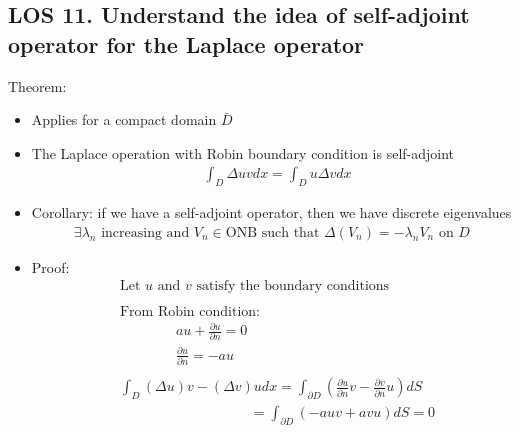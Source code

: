 \documentclass[12pt, a4paper]{article}
\begin{document}
\subsection*{LOS 11. Understand the idea of self-adjoint operator for the Laplace operator}
Theorem:
\begin{itemize}
    \item Applies for a compact domain $\bar{D}$
    \item The Laplace operation with Robin boundary condition is self-adjoint
    \begin{align*}
        &\int_D\Delta uv dx = \int_D u \Delta vdx
    \end{align*}
    \item Corollary: if we have a self-adjoint operator, then we have discrete eigenvalues
    \begin{align*}
        \exists \lambda_n \text{ increasing and }V_n \in \text{ONB such that }\Delta(V_n)=-\lambda_nV_n \text{ on }D
    \end{align*}
    \item Proof:
    \begin{align*}
        &\text{Let $u$ and $v$ satisfy the boundary conditions}\\\\
        &\text{From Robin condition:}\\
        &\qquad\qquad au+\frac{\partial u}{\partial n} = 0\\
        &\qquad\qquad \frac{\partial u}{\partial n} = -au\\\\
        &\int_{D} (\Delta u)v - (\Delta v)u dx = \int_{\partial D}\left(\frac{\partial u}{\partial n}v-\frac{\partial v}{\partial n}u \right)dS \\
        &\qquad\qquad\qquad\qquad\quad\;=\int_{\partial D}(-auv+avu)dS=0\\
    \end{align*}
\end{itemize}
\vspace{0.3em}
\end{document}
